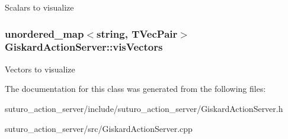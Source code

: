 Scalars to visualize \hypertarget{classGiskardActionServer_abdad3a9c717ec286399323b152a8e64d}{
\subsubsection[{vis\-Vectors}]{\setlength{\rightskip}{0pt plus 5cm}unordered\-\_\-map$<$string, {\bf T\-Vec\-Pair}$>$ Giskard\-Action\-Server\-::vis\-Vectors\hspace{0.3cm}{\ttfamily [private]}}}\label{classGiskardActionServer_abdad3a9c717ec286399323b152a8e64d}
Vectors to visualize 

The documentation for this class was generated from the following files\-:\begin{DoxyCompactItemize}
\item 
suturo\-\_\-action\-\_\-server/include/suturo\-\_\-action\-\_\-server/Giskard\-Action\-Server.\-h\item 
suturo\-\_\-action\-\_\-server/src/Giskard\-Action\-Server.\-cpp\end{DoxyCompactItemize}
